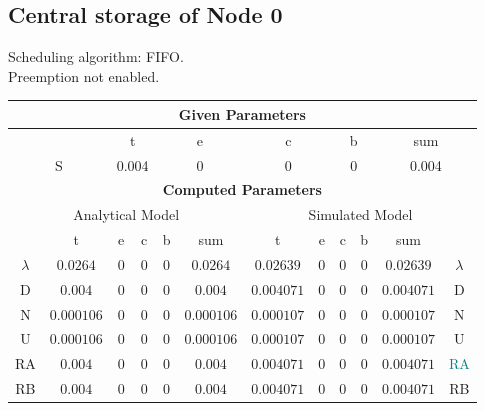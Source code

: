 \documentclass{article}
\begin{document}
\subsection{Central storage of Node 0}
Scheduling algorithm: FIFO.\\Preemption not enabled. \\\begin{table}[H]\centering\begin{tabular}{@{}c|cccc|c||cccc|c|c@{}}\toprule\multicolumn{12}{c}{\textbf{Given Parameters}}\\\midrule\multicolumn{2}{c|}{ } & \multicolumn{2}{c}{t} & \multicolumn{2}{c}{e} & \multicolumn{2}{c}{c} & \multicolumn{2}{c}{b} & \multicolumn{2}{|c}{sum} \\ \midrule\multicolumn{2}{c|}{S} & \multicolumn{2}{c}{0.004} & \multicolumn{2}{c}{0} & \multicolumn{2}{c}{0} & \multicolumn{2}{c}{0} & \multicolumn{2}{|c}{0.004}\\ \midrule\midrule\multicolumn{12}{c}{\textbf{Computed Parameters}}\\ \midrule\multicolumn{6}{c||}{Analytical Model} & \multicolumn{6}{c}{Simulated Model}\\ 
 \midrule & t & e & c & b & sum & t & e & c & b & sum &  \\ \midrule$\lambda$ &$0.0264$ & $0$ & $0$ & $0$ & $0.0264$ & $0.02639$ & $0$ & $0$ & $0$ & $0.02639$& $\lambda$ \\D & $0.004$ & $0$ & $0$ & $0$ & $0.004$ & $0.004071$ & $0$ & $0$ & $0$ & $0.004071$& D\\N & $0.000106$ & $0$ & $0$ & $0$ & $0.000106$ & $0.000107$ & $0$ & $0$ & $0$ & $0.000107$& N\\U & $0.000106$ & $0$ & $0$ & $0$ & $0.000106$ & $0.000107$ & $0$ & $0$ & $0$ & $0.000107$& U\\RA & $0.004$ & $0$ & $0$ & $0$ & $0.004$ & $0.004071$ & $0$ & $0$ & $0$ & $0.004071$& \textcolor{teal}{RA}\\RB & $0.004$ & $0$ & $0$ & $0$ & $0.004$ & $0.004071$ & $0$ & $0$ & $0$ & $0.004071$& RB\\
\bottomrule
\end{tabular}
\end{table}
\filbreak
\end{document}

